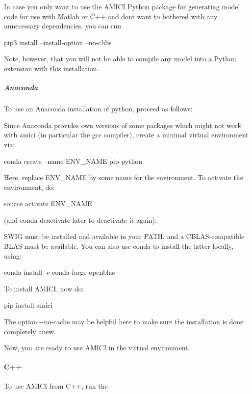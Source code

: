 In case you only want to use the A\+M\+I\+CI Python package for generating model code for use with Matlab or C++ and don\textquotesingle{}t want to bothered with any unnecessary dependencies, you can run \begin{DoxyVerb}pip3 install --install-option --no-clibs
\end{DoxyVerb}


Note, however, that you will not be able to compile any model into a Python extension with this installation.

\subparagraph*{Anaconda}

To use an Anaconda installation of python, proceed as follows\+:

Since Anaconda provides own versions of some packages which might not work with amici (in particular the gcc compiler), create a minimal virtual environment via\+: \begin{DoxyVerb}conda create --name ENV_NAME pip python
\end{DoxyVerb}


Here, replace E\+N\+V\+\_\+\+N\+A\+ME by some name for the environment. To activate the environment, do\+: \begin{DoxyVerb}source activate ENV_NAME
\end{DoxyVerb}


(and {\ttfamily conda deactivate} later to deactivate it again).

S\+W\+IG must be installed and available in your {\ttfamily P\+A\+TH}, and a C\+B\+L\+A\+S-\/compatible B\+L\+AS must be available. You can also use conda to install the latter locally, using\+: \begin{DoxyVerb}conda install -c conda-forge openblas
\end{DoxyVerb}


To install A\+M\+I\+CI, now do\+: \begin{DoxyVerb}pip install amici
\end{DoxyVerb}


The option {\ttfamily -\/-\/no-\/cache} may be helpful here to make sure the installation is done completely anew.

Now, you are ready to use A\+M\+I\+CI in the virtual environment.

\paragraph*{C++}

To use A\+M\+I\+CI from C++, run the

